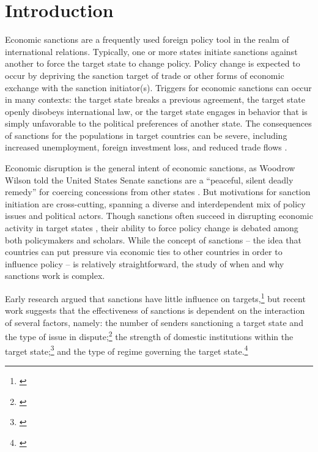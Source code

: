 \section*{Introduction}
\label{intro}

Economic sanctions are a frequently used foreign policy tool in the realm of international relations. Typically, one or more states initiate sanctions against another to force the target state to change policy. Policy change is expected to occur by depriving the sanction target of trade or other forms of economic exchange with the sanction initiator(s). Triggers for economic sanctions can occur in many contexts: the target state breaks a previous agreement, the target state openly disobeys international law, or the target state engages in behavior that is simply unfavorable to the political preferences of another state. The consequences of sanctions for the populations in target countries can be severe, including increased unemployment, foreign investment loss, and reduced trade flows \citep{hufbauer2003impact,hufbauer1997us}. 

Economic disruption is the general intent of economic sanctions, as Woodrow Wilson told the United States Senate sanctions are a ``peaceful, silent deadly remedy'' for coercing concessions from other states \citep{foley23}. But motivations for sanction initiation are cross-cutting, spanning a diverse and interdependent mix of policy issues and political actors. Though sanctions often succeed in disrupting economic activity in target states \citep{escriba2010dealing}, their ability to force policy change is debated among both policymakers and scholars.  While the concept of sanctions -- the idea that countries can put pressure via economic ties to other countries in order to influence policy -- is relatively straightforward, the study of when and why sanctions work is complex.

Early research argued that sanctions have little influence on targets,\footnote{\cite{lam1990, dashti1997, morgan1997, drezner1998}} but recent work suggests that the effectiveness of sanctions is dependent on the interaction of several factors, namely: the number of senders sanctioning a target state and the type of issue in dispute;\footnote{\cite{miers2002, morgan2009threat}} the strength of domestic institutions within the target state;\footnote{\cite{dashti1997,marinov2005}} and the type of regime governing the target state.\footnote{\cite{mcgillivray2004,lektzian2007,allen2008domestic}} 


